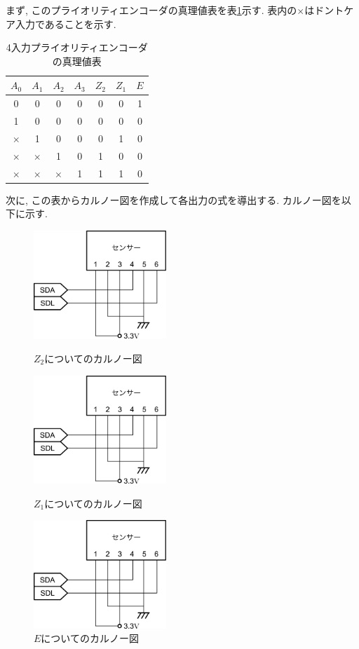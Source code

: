 \documentclass[titlepage]{jsarticle}
\begin{document}
    まず, このプライオリティエンコーダの真理値表を表\ref{tab:priority_encoder}示す.
    表内の$\times$はドントケア入力であることを示す.
    \begin{table}[h]
      \caption{4入力プライオリティエンコーダの真理値表}
      \label{tab:priority_encoder}
      \centering
      \begin{tabular}{cccc||ccc}
        \hline
        $A_0$ & $A_1$ & $A_2$ & $A_3$ & $Z_2$ & $Z_1$ & $E$ \\ \hline \hline
        0 & 0 & 0 & 0 & 0 & 0 & 1 \\
        1 & 0 & 0 & 0 & 0 & 0 & 0 \\
        $\times$ & 1 & 0 & 0 & 0 & 1 & 0 \\
        $\times$ & $\times$ & 1 & 0 & 1 & 0 & 0 \\
        $\times$ & $\times$ & $\times$ & 1 & 1 & 1 & 0 \\ \hline
      \end{tabular}
    \end{table}

    次に, この表からカルノー図を作成して各出力の式を導出する.
    カルノー図を以下に示す.
    \begin{figure}[h]
      \begin{minipage}{0.33\hsize}
        \centering
        \includegraphics[width=5cm]{images/haisen.pdf}
        \caption{$Z_2$についてのカルノー図}
      \end{minipage}
      \begin{minipage}{0.33\hsize}
        \centering
        \includegraphics[width=5cm]{images/haisen.pdf}
        \caption{$Z_1$についてのカルノー図}
      \end{minipage}
      \begin{minipage}{0.33\hsize}
        \centering
        \includegraphics[width=5cm]{images/haisen.pdf}
        \caption{$E$についてのカルノー図}
      \end{minipage}
    \end{figure}
\end{document}
